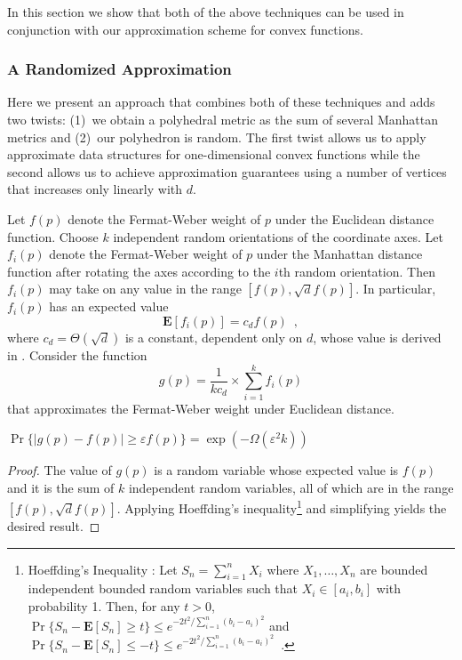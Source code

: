 \documentclass[charterfonts,lotsofwhite]{patmorin}
\newcommand{\eps}{\varepsilon}
\newcommand{\E}{\mathbf{E}}
\begin{document}
In this section we show that both of the above techniques can be used
in conjunction with our approximation scheme for convex functions.


\subsubsection{A Randomized Approximation}

Here we present an approach that combines both of these techniques and
adds two twists: (1)~we obtain a polyhedral metric as the sum of
several Manhattan metrics and (2)~our polyhedron is random.  The first
twist allows us to apply approximate data structures for
one-dimensional convex functions while the second allows us to achieve
approximation guarantees using a number of vertices that increases
only linearly with $d$. 

Let $f(p)$ denote the Fermat-Weber weight of $p$ under the Euclidean
distance function.  Choose $k$ independent random orientations of the
coordinate axes.  Let $f_i(p)$ denote the Fermat-Weber weight of $p$
under the Manhattan distance function after rotating the axes
according to the $i$th random orientation.  Then $f_i(p)$ may take on
any value in the range $[f(p),\sqrt df(p)]$.  In particular, $f_i(p)$
has an expected value \[ \E[f_i(p)]=c_df(p) \enspace , \] where
$c_d=\Theta(\sqrt{d})$ is a constant, dependent only on $d$, whose
value is derived in .  Consider the function \[ g(p) =
\frac{1}{kc_d}\times\sum_{i=1}^k f_i(p) \] that approximates the
Fermat-Weber weight under Euclidean distance.

\begin{lem}
$\Pr\{|g(p)-f(p)| \ge \eps f(p)\} = \exp(-\Omega(\eps^2k))$
\end{lem}

\begin{proof}
The value of $g(p)$ is a random variable whose expected value is
$f(p)$ and it is the sum of $k$ independent random variables, all of
which are in the range $[f(p),\sqrt d f(p)]$.  Applying Hoeffding's
inequality\footnote{Hoeffding's Inequality \cite{h63}: Let
$S_n=\sum_{i=1}^n X_i$ where $X_1,\ldots,X_n$ are
bounded independent bounded random variables such that $X_i\in[a_i,b_i]$ with probability 1.  Then, for any $t>0$,
$
    \Pr\{S_n - \E[S_n] \ge t\} 
   \le e^{-2t^2/\sum_{i=1}^n(b_i-a_i)^2}
$
and
$
    \Pr\{S_n - \E[S_n] \le -t\} 
   \le e^{-2t^2/\sum_{i=1}^n(b_i-a_i)^2} \enspace .
$
} and simplifying yields the desired
result.
\end{proof}
\end{document}
